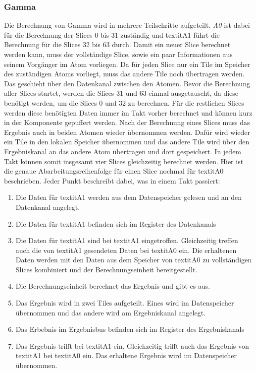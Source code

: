 \subsubsection{Gamma}
Die Berechnung von Gamma wird in mehrere Teilschritte aufgeteilt. \textit{A0} ist dabei für die Berechnung der Slices 0 bis 31 zuständig und textit{A1}
führt die Berechnung für die Slices 32 bis 63 durch. Damit ein neuer Slice berechnet werden kann, muss der vollständige Slice,
sowie ein paar Informationen aus seinem Vorgänger im Atom vorliegen. Da für jeden Slice nur ein Tile im Speicher des zuständigen Atoms vorliegt,
muss das andere Tile noch übertragen werden. Das geschieht über den Datenkanal zwischen den Atomen. Bevor die Berechnung aller Slices startet,
werden die Slices 31 und 63 einmal ausgetauscht, da diese benötigt werden, um die Slices 0 und 32 zu berechnen. Für die restlichen Slices
werden diese benötigten Daten immer im Takt vorher berechnet und können kurz in der Komponente gepuffert werden.
Nach der Berechnung eines Slices muss das Ergebnis auch in beiden Atomen wieder übernommen werden. Dafür wird wieder ein Tile in den lokalen Speicher übernommen
und das andere Tile wird über den Ergebniskanal an das andere Atom übertragen und dort gespeichert. In jedem Takt können somit insgesamt vier Slices gleichzeitig berechnet werden.
Hier ist die genaue Abarbeitungsreihenfolge für einen Slice nochmal für textit{A0} beschrieben. Jeder Punkt beschreibt dabei, was in einem Takt passiert:
\begin{enumerate}
\item Die Daten für textit{A1} werden aus dem Datenspeicher gelesen und an den Datenkanal angelegt.
\item Die Daten für textit{A1} befinden sich im Register des Datenkanals
\item Die Daten für textit{A1} sind bei textit{A1} eingetroffen. Gleichzeitig treffen auch die von textit{A1} gesendeten Daten bei textit{A0} ein.
Die erhaltenen Daten werden mit den Daten aus dem Speicher von textit{A0} zu vollständigen Slices kombiniert und der Berechnungseinheit bereitgestellt.
\item Die Berechnungseinheit berechnet das Ergebnis und gibt es aus.
\item Das Ergebnis wird in zwei Tiles aufgeteilt. Eines wird im Datenspeicher übernommen und das andere wird am Ergebniskanal angelegt.
\item Das Erbebnis im Ergebnisbus befinden sich im Register des Ergebniskanals
\item Das Ergebnis trifft bei textit{A1} ein. Gleichzeitig trifft auch das Ergebnis von textit{A1} bei textit{A0} ein.
Das erhaltene Ergebnis wird im Datenspeicher übernommen.
\end{enumerate}
